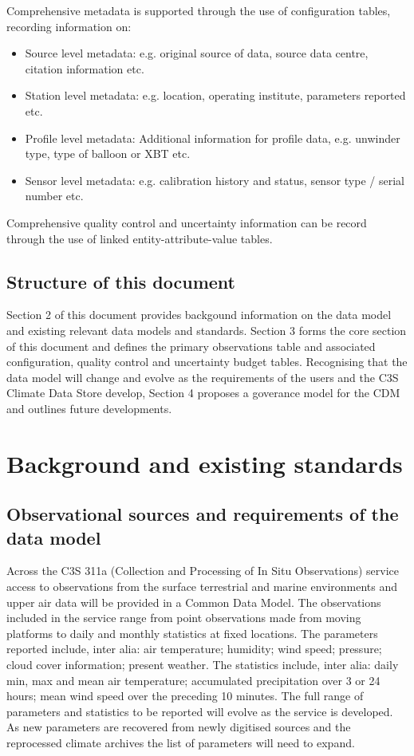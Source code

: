 \documentclass[a4paper]{article}
\begin{document}
Comprehensive metadata is supported through the use of configuration tables, recording information on:
\begin{itemize}
\item Source level metadata: e.g. original source of data, source data centre, citation information etc.
\item Station level metadata: e.g. location, operating institute, parameters reported etc.
\item Profile level metadata: Additional information for profile data, e.g. unwinder type, type of balloon or XBT etc.
\item Sensor level metadata: e.g. calibration history and status, sensor type / serial number etc.
\end{itemize}
Comprehensive quality control and uncertainty information can be record through the use of linked entity-attribute-value tables.

\subsection {Structure of this document}

Section 2 of this document provides backgound information on the data model and existing relevant data models and standards. Section 3 forms the core section of this document and defines the primary observations table and associated configuration, quality control and uncertainty budget tables. Recognising that the data model will change and evolve as the requirements of the users and the C3S Climate Data Store develop, Section 4 proposes a goverance model for the CDM and outlines future developments.

\section {Background and existing standards}
\subsection {Observational sources and requirements of the data model}

Across the C3S 311a (Collection and Processing of In Situ Observations) service access to observations from the surface terrestrial and marine environments and upper air data will be provided in a Common Data Model. The observations included in the service range from point observations made from moving platforms to daily and monthly statistics at fixed locations.  The parameters reported include, inter alia: air temperature; humidity; wind speed; pressure; cloud cover information; present weather. The statistics include, inter alia: daily min, max and mean air temperature; accumulated precipitation over 3 or 24 hours; mean wind speed over the preceding 10 minutes. The full range of parameters and statistics to be reported will evolve as the service is developed. As new parameters are recovered from newly digitised sources and the reprocessed climate archives the list of parameters will need to expand.\\
\end{document}
